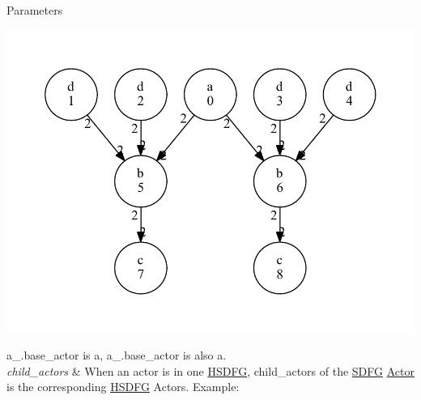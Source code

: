 \begin{DoxyParams}{Parameters}
\begin{DoxyImage}
\includegraphics[width=\textwidth,height=\textheight/2,keepaspectratio=true]{dot_HSDFG_example}
\end{DoxyImage}
 {\ttfamily a\+\_.\+base\+\_\+actor} is {\ttfamily a}, {\ttfamily a\+\_.\+base\+\_\+actor} is also {\ttfamily a}. \\
\hline
{\em child\+\_\+actors} & When an actor is in one \hyperlink{classsylva_1_1base_1_1sdf_1_1_h_s_d_f_g}{H\+S\+D\+FG}, child\+\_\+actors of the \hyperlink{classsylva_1_1base_1_1sdf_1_1_s_d_f_g}{S\+D\+FG} \hyperlink{classsylva_1_1base_1_1sdf_1_1_actor}{Actor} is the corresponding \hyperlink{classsylva_1_1base_1_1sdf_1_1_h_s_d_f_g}{H\+S\+D\+FG} Actors. Example\+: 
\begin{DoxyImage}

\end{DoxyImage}
\end{DoxyParams}
